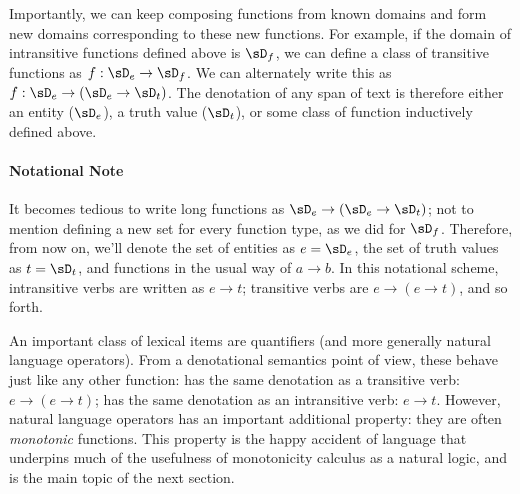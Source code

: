 Importantly, we can keep composing functions from known domains and form new
  domains corresponding to these new functions.
For example, if the domain of intransitive functions defined above is $\sD_f$,
  we can define a class of transitive functions as $f : \sD_e \rightarrow \sD_f$.
We can alternately write this as $f : \sD_e \rightarrow (\sD_e \rightarrow \sD_t)$.
The denotation of any span of text is therefore either an entity ($\sD_e$), a truth
  value ($\sD_t$), or some class of function inductively defined above.

\paragraph{Notational Note}
It becomes tedious to write long functions as $\sD_e \rightarrow (\sD_e \rightarrow \sD_t)$;
  not to mention defining a new set for every function type, as we did for $\sD_f$.
Therefore, from now on, we'll denote the set of entities as $e = \sD_e$, the set of truth values as 
  $t = \sD_t$, and functions in the usual way of $a \rightarrow b$.
In this notational scheme, intransitive verbs are written as $e \rightarrow t$; transitive
  verbs are $e \rightarrow (e \rightarrow t)$, and so forth.



An important class of lexical items are quantifiers (and more generally natural language
  operators).
From a denotational semantics point of view, these behave just like any other function:
   has the same denotation as a transitive verb: $e \rightarrow (e \rightarrow t)$;
   has the same denotation as an intransitive verb: $e \rightarrow t$.
However, natural language operators has an important additional property: they are often
  \textit{monotonic} functions.
This property is the happy accident of language that underpins much of the usefulness
  of monotonicity calculus as a natural logic, and is the main topic of the next section.






